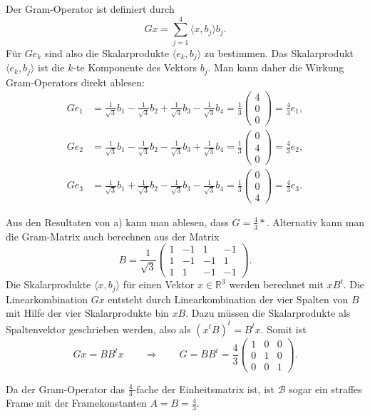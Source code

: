 \begin{loesung}
\begin{teilaufgaben}
\item
Der Gram-Operator ist definiert durch
\[
Gx = \sum_{j=1}^4 \langle x,b_j\rangle b_j.
\]
Für $Ge_k$ sind also die Skalarprodukte $\langle e_k,b_j\rangle$
zu bestimmen.
Das Skalarprodukt $\langle e_k,b_j\rangle$ ist die $k$-te Komponente 
des Vektors $b_j$.
Man kann daher die Wirkung Gram-Operators direkt ablesen:
\begin{align*}
Ge_1
&=
\frac{1}{\sqrt{3}} b_1
-
\frac{1}{\sqrt{3}} b_2
+
\frac{1}{\sqrt{3}} b_3
-
\frac{1}{\sqrt{3}} b_4
=
\frac13
\begin{pmatrix}
4\\0\\0
\end{pmatrix}
=
\frac43 e_1,
\\
Ge_2
&=
\frac{1}{\sqrt{3}} b_1
-
\frac{1}{\sqrt{3}} b_2
-
\frac{1}{\sqrt{3}} b_3
+
\frac{1}{\sqrt{3}} b_4
=
\frac13
\begin{pmatrix}
0\\4\\0
\end{pmatrix}
=
\frac43 e_2,
\\
Ge_3
&=
\frac{1}{\sqrt{3}} b_1
+
\frac{1}{\sqrt{3}} b_2
-
\frac{1}{\sqrt{3}} b_3
-
\frac{1}{\sqrt{3}} b_4
=
\frac13
\begin{pmatrix}
0\\0\\4
\end{pmatrix}
=
\frac43 e_3.
\end{align*}
\item
Aus den Resultaten von a) kann man ablesen, dass $G=\frac43*$.
Alternativ kann man die Gram-Matrix auch berechnen aus der Matrix 
\[
B
=
\frac{1}{\sqrt{3}}
\begin{pmatrix}
 1&-1& 1&-1\\
 1&-1&-1& 1\\
 1& 1&-1&-1
\end{pmatrix}.
\]
Die Skalarprodukte $\langle x,b_j\rangle$ für einen Vektor $x\in\mathbb R^3$
werden berechnet mit $xB^t$.
Die Linearkombination $Gx$ entsteht durch Linearkombination der vier Spalten
von $B$ mit Hilfe der vier Skalarprodukte bin $xB$.
Dazu müssen die Skalarprodukte als Spaltenvektor geschrieben werden, also
als $(x^tB)^t=B^tx$.
Somit ist
\[
Gx = BB^t x
\qquad\Rightarrow\qquad
G=BB^t
=
\frac{4}{3}
\begin{pmatrix}
1&0&0\\
0&1&0\\
0&0&1
\end{pmatrix}.
\]
\item
Da der Gram-Operator das $\frac43$-fache der Einheitsmatrix ist, ist
$\mathcal{B}$ sogar ein straffes Frame mit der Framekonstanten $A=B=\frac43$.
\qedhere
\end{teilaufgaben}
\end{loesung}

